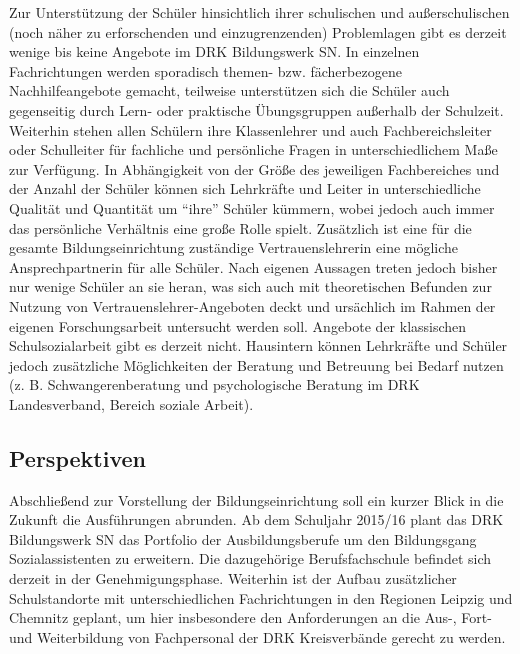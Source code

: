 Zur Unterstützung der Schüler hinsichtlich ihrer schulischen und außerschulischen (noch näher zu erforschenden und einzugrenzenden) Problemlagen gibt es derzeit wenige bis keine Angebote im DRK Bildungswerk SN. In einzelnen Fachrichtungen werden sporadisch themen- bzw. fächerbezogene Nachhilfeangebote gemacht, teilweise unterstützen sich die Schüler auch gegenseitig durch Lern- oder praktische Übungsgruppen außerhalb der Schulzeit. Weiterhin stehen allen Schülern ihre Klassenlehrer und auch Fachbereichsleiter oder Schulleiter für fachliche und persönliche Fragen in unterschiedlichem Maße zur Verfügung. In Abhängigkeit von der Größe des jeweiligen Fachbereiches und der Anzahl der Schüler können sich Lehrkräfte und Leiter in unterschiedliche Qualität und Quantität um "`ihre"' Schüler kümmern, wobei jedoch auch immer das persönliche Verhältnis eine große Rolle spielt. Zusätzlich ist eine für die gesamte Bildungseinrichtung zuständige Vertrauenslehrerin eine mögliche Ansprechpartnerin für alle Schüler. Nach eigenen Aussagen treten jedoch bisher nur wenige Schüler an sie heran, was sich auch mit theoretischen Befunden zur Nutzung von Vertrauenslehrer-Angeboten deckt und ursächlich im Rahmen der eigenen Forschungsarbeit untersucht werden soll. Angebote der klassischen Schulsozialarbeit gibt es derzeit nicht. Hausintern können Lehrkräfte und Schüler jedoch zusätzliche Möglichkeiten der Beratung und Betreuung bei Bedarf nutzen (z. B. Schwangerenberatung und psychologische Beratung im DRK Landesverband, Bereich soziale Arbeit).  

\subsection{Perspektiven}
\label{sec:Perspektiven}

Abschließend zur Vorstellung der Bildungseinrichtung soll ein kurzer Blick in die Zukunft die Ausführungen abrunden. Ab dem Schuljahr 2015/16 plant das DRK Bildungswerk SN das Portfolio der Ausbildungsberufe um den Bildungsgang Sozialassistenten zu erweitern. Die dazugehörige Berufsfachschule befindet sich derzeit in der Genehmigungsphase. Weiterhin ist der Aufbau zusätzlicher Schulstandorte mit unterschiedlichen Fachrichtungen in den Regionen Leipzig und Chemnitz geplant, um hier insbesondere den Anforderungen an die Aus-, Fort- und Weiterbildung von Fachpersonal der DRK Kreisverbände gerecht zu werden.

